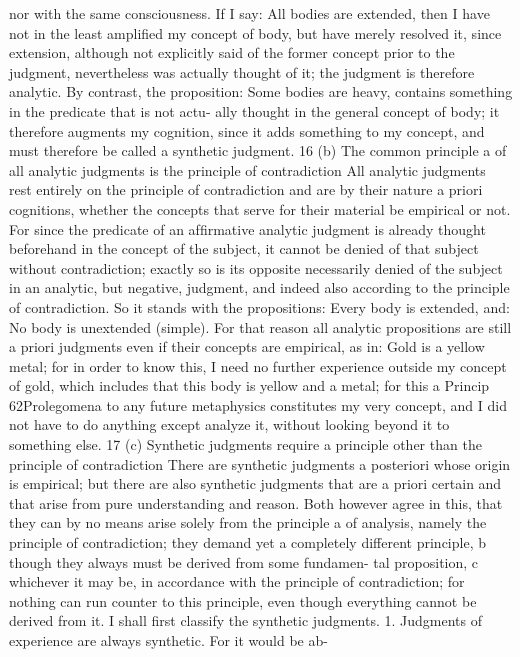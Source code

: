 nor with the same consciousness. If I say: All bodies are extended, then
I have not in the least ampliﬁed my concept of body, but have merely
resolved it, since extension, although not explicitly said of the former
concept prior to the judgment, nevertheless was actually thought of it;
the judgment is therefore analytic. By contrast, the proposition: Some
bodies are heavy, contains something in the predicate that is not actu-
ally thought in the general concept of body; it therefore augments my
cognition, since it adds something to my concept, and must therefore be
called a synthetic judgment. 16
(b) The common principle a of all analytic judgments
is the principle of contradiction
All analytic judgments rest entirely on the principle of contradiction
and are by their nature a priori cognitions, whether the concepts that
serve for their material be empirical or not. For since the predicate
of an afﬁrmative analytic judgment is already thought beforehand in
the concept of the subject, it cannot be denied of that subject without
contradiction; exactly so is its opposite necessarily denied of the subject
in an analytic, but negative, judgment, and indeed also according to the
principle of contradiction. So it stands with the propositions: Every body
is extended, and: No body is unextended (simple).
For that reason all analytic propositions are still a priori judgments
even if their concepts are empirical, as in: Gold is a yellow metal; for
in order to know this, I need no further experience outside my concept
of gold, which includes that this body is yellow and a metal; for this
a
Princip
62Prolegomena to any future metaphysics
constitutes my very concept, and I did not have to do anything except
analyze it, without looking beyond it to something else. 17
(c) Synthetic judgments require a principle other than
the principle of contradiction
There are synthetic judgments a posteriori whose origin is empirical; but
there are also synthetic judgments that are a priori certain and that arise
from pure understanding and reason. Both however agree in this, that
they can by no means arise solely from the principle a of analysis, namely
the principle of contradiction; they demand yet a completely different
principle, b though they always must be derived from some fundamen-
tal proposition, c whichever it may be, in accordance with the principle of
contradiction; for nothing can run counter to this principle, even though
everything cannot be derived from it. I shall ﬁrst classify the synthetic
judgments.
1. Judgments of experience are always synthetic. For it would be ab-
